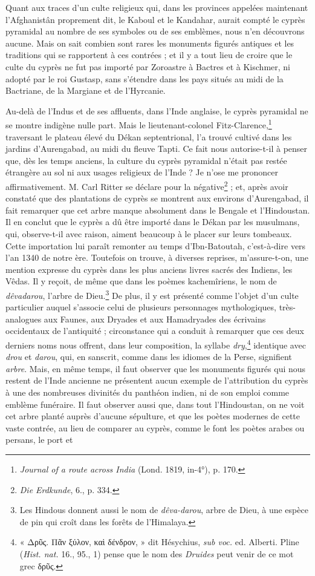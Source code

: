 \documentclass{article}
\begin{document}
Quant aux traces d'un culte religieux qui, dans les provinces appelées maintenant l'Afghanistân proprement dit, le Kaboul et le Kandahar, aurait compté le cyprès pyramidal au nombre de ses symboles ou de ses emblèmes, nous n'en découvrons aucune. Mais on sait combien sont rares les monuments figurés antiques et les traditions qui se rapportent à ces contrées ; et il y a tout lieu de croire que le culte du cyprès ne fut pas importé par Zoroastre à Bactres et à Kischmer, ni adopté par le roi Gustasp, sans s'étendre dans les pays situés au midi de la Bactriane, de la Margiane et de l'Hyrcanie.

Au-delà de l'Indus et de ses affluents, dans l'Inde anglaise, le cyprès pyramidal ne se montre indigène nulle part. Mais le lieutenant-colonel Fitz-Clarence,\footnote{\emph{Journal of a route across India} (Lond. 1819, in-4°), p. 170.} traversant le plateau élevé du Dékan septentrional, l'a trouvé cultivé dans les jardins d'Aurengabad, au midi du fleuve Tapti. Ce fait nous autorise-t-il à penser que, dès les temps anciens, la culture du cyprès pyramidal n'était pas restée étrangère au sol ni aux usages religieux de l'Inde ? Je n'ose me prononcer affirmativement. M. Carl Ritter se déclare pour la négative\footnote{\emph{Die Erdkunde}, 6., p. 334.} ; et, après avoir constaté que des plantations de cyprès se montrent aux environs d'Aurengabad, il fait remarquer que cet arbre manque absolument dans le Bengale et l'Hindoustan. Il en conclut que le cyprès a dû être importé dans le Dékan par les musulmans, qui, observe-t-il avec raison, aiment beaucoup à le placer sur leurs tombeaux. Cette importation lui paraît remonter au temps d'Ibn-Batoutah, c'est-à-dire vers l'an 1340 de notre ère. Toutefois on trouve, à diverses reprises, m'assure-t-on, une mention expresse du cyprès dans les plus anciens livres sacrés des Indiens, les Vêdas. Il y reçoit, de même que dans les poèmes kachemîriens, le nom de \emph{dêvadarou}, l'arbre de Dieu.\footnote{Les Hindous donnent aussi le nom de \emph{dêva-darou}, arbre de Dieu, à une espèce de pin qui croît dans les forêts de l'Himalaya.} De plus, il y est présenté comme l'objet d'un culte particulier auquel s'associe celui de plusieurs personnages mythologiques, très-analogues aux Faunes, aux Dryades et aux Hamadryades des écrivains occidentaux de l'antiquité ; circonstance qui a conduit à remarquer que ces deux derniers noms nous offrent, dans leur composition, la syllabe \emph{dry},\footnote{« \textgreek{Δρῦς. Πᾶν ξύλον, καὶ δένδρον}, » dit Hésychius, \emph{sub voc.} ed. Alberti. Pline (\emph{Hist. nat.} 16., 95., 1) pense que le nom des \emph{Druides} peut venir de ce mot grec \textgreek{δρῦς}.} identique avec \emph{drou} et \emph{darou}, qui, en sanscrit, comme dans les idiomes de la Perse, signifient \emph{arbre}. Mais, en même temps, il faut observer que les monuments figurés qui nous restent de l'Inde ancienne ne présentent aucun exemple de l'attribution du cyprès à une des nombreuses divinités du panthéon indien, ni de son emploi comme emblème funéraire. Il faut observer aussi que, dans tout l'Hindoustan, on ne voit cet arbre planté auprès d'aucune sépulture, et que les poètes modernes de cette vaste contrée, au lieu de comparer au cyprès, comme le font les poètes arabes ou persans, le port et 
\end{document}
